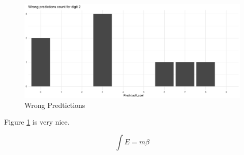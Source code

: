\begin{figure}[H]
    \includegraphics[width=\linewidth]{img/wrong_predictions.jpeg}
    \centering
    \caption{Wrong Predtictions}
    \label{fig:wrong-predictions}
\end{figure}

Figure \ref{fig:wrong-predictions} is very nice.

\begin{equation}
    \int E=m \beta
\end{equation}